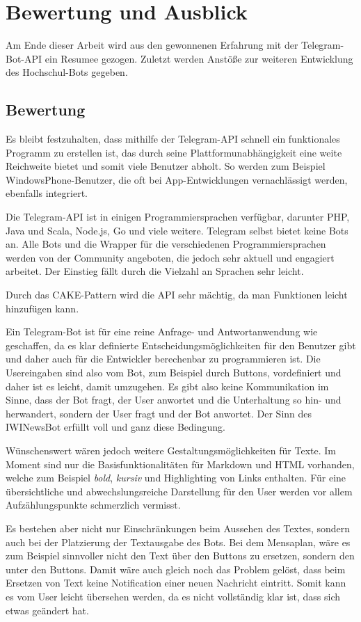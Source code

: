 \chapter{Bewertung und Ausblick}
Am Ende dieser Arbeit wird aus den gewonnenen Erfahrung mit der Telegram-Bot-API ein Resumee gezogen. Zuletzt werden Anstöße zur weiteren Entwicklung des Hochschul-Bots gegeben.

\section{Bewertung}
Es bleibt festzuhalten, dass mithilfe der Telegram-API schnell ein funktionales Programm zu erstellen ist, das durch seine Plattformunabhängigkeit eine weite Reichweite bietet und somit viele Benutzer abholt. So werden zum Beispiel WindowsPhone-Benutzer, die oft bei App-Entwicklungen vernachlässigt werden, ebenfalls integriert.

Die Telegram-API ist in einigen Programmiersprachen verfügbar, darunter PHP, Java und Scala, Node.js, Go und viele weitere. Telegram selbst bietet keine Bots an. Alle Bots und die Wrapper für die verschiedenen Programmiersprachen werden von der Community angeboten, die jedoch sehr aktuell und engagiert arbeitet. Der Einstieg fällt durch die Vielzahl an Sprachen sehr leicht.

Durch das CAKE-Pattern wird die API sehr mächtig, da man Funktionen leicht hinzufügen kann.

Ein Telegram-Bot ist für eine reine Anfrage- und Antwortanwendung wie geschaffen, da es klar definierte Entscheidungsmöglichkeiten für den Benutzer gibt und daher auch für die Entwickler berechenbar zu programmieren ist. Die Usereingaben sind also vom Bot, zum Beispiel durch Buttons, vordefiniert und daher ist es leicht, damit umzugehen. Es gibt also keine Kommunikation im Sinne, dass der Bot fragt, der User anwortet und die Unterhaltung so hin- und herwandert, sondern der User fragt und der Bot anwortet.
Der Sinn des IWINewsBot erfüllt voll und ganz diese Bedingung.

Wünschenswert wären jedoch weitere Gestaltungsmöglichkeiten für Texte. Im Moment sind nur die Basisfunktionalitäten für Markdown und HTML vorhanden, welche zum Beispiel \emph{bold}, \emph{kursiv} und Highlighting von Links enthalten.
Für eine übersichtliche und abwechslungsreiche Darstellung für den User werden vor allem Aufzählungspunkte schmerzlich vermisst.

Es bestehen aber nicht nur Einschränkungen beim Aussehen des Textes, sondern auch bei der Platzierung der Textausgabe des Bots.
Bei dem Mensaplan, wäre es zum Beispiel sinnvoller nicht den Text über den Buttons zu ersetzen, sondern den unter den Buttons. Damit wäre auch gleich noch das Problem gelöst, dass beim Ersetzen von Text keine Notification einer neuen Nachricht eintritt. Somit kann es vom User leicht übersehen werden, da es nicht vollständig klar ist, dass sich etwas geändert hat.

